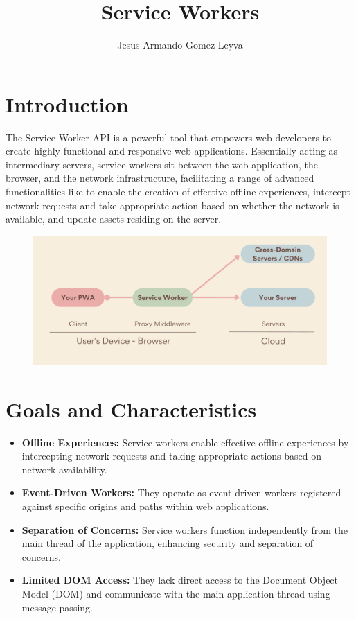 \documentclass{article}
\title{\color{darkblue}\LARGE Service Workers}
\author{Jesus Armando Gomez Leyva}
\begin{document}
\maketitle

\section*{\color{darkblue}\Large Introduction}

The Service Worker API is a powerful tool that empowers web developers to create highly functional and responsive web applications. Essentially acting as intermediary servers, service workers sit between the web application, the browser, and the network infrastructure, facilitating a range of advanced functionalities like  to enable the creation of effective offline experiences, intercept network requests and take appropriate action based on whether the network is available, and update assets residing on the server.
\citep{ServiceWorker}


\begin{figure}[h]
    \centering
    \includegraphics[width=1\textwidth]{images/serviceworker.png}

\end{figure}

\section*{\color{darkblue}\Large Goals and Characteristics}

\begin{itemize}[label=$\bullet$, leftmargin=*]
    \item \textbf{Offline Experiences:} Service workers enable effective offline experiences by intercepting network requests and taking appropriate actions based on network availability.
    \item \textbf{Event-Driven Workers:} They operate as event-driven workers registered against specific origins and paths within web applications.
    \item \textbf{Separation of Concerns:} Service workers function independently from the main thread of the application, enhancing security and separation of concerns.
    \item \textbf{Limited DOM Access:} They lack direct access to the Document Object Model (DOM) and communicate with the main application thread using message passing.
\end{itemize}
\end{document}
